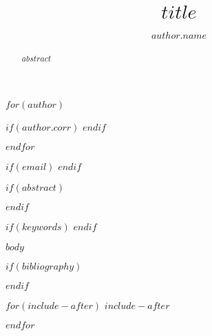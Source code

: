 \documentclass[$if(classoption)$$classoption$$endif$]{JASA-El}
\begin{document}
\title[$runningtitle$]{$title$}

$for(author)$
 \author{$author.name$}

 $if(author.corr)$
  \correspondingauthor
 $endif$

$endfor$

$if(email)$
$endif$

$if(abstract)$
 \begin{abstract}
$abstract$
 \end{abstract}
$endif$

$if(keywords)$
$endif$



\maketitle

$body$

$if(bibliography)$


$endif$

$for(include-after)$
$include-after$

$endfor$
\end{document}
